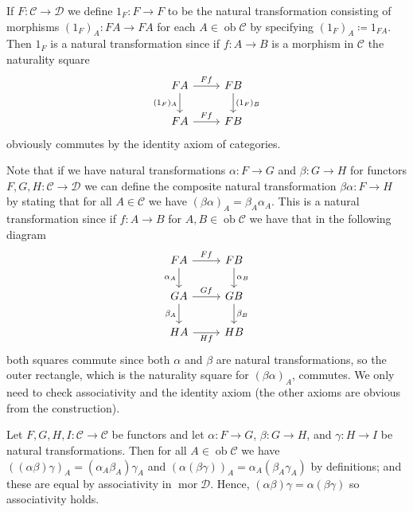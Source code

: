 \documentclass{report}
\DeclareMathOperator{\ob}{ob}
\DeclareMathOperator{\mor}{mor}
\theoremstyle{definition}
\theoremstyle{plain}
\theoremstyle{definition}
\begin{document}
	If $F\colon \mathcal{C} \to \mathcal{D}$ we define $1_F \colon F \to F$ to be the natural transformation consisting of morphisms $(1_F)_A \colon FA \to FA$ for each $A\in \ob \mathcal{C}$ by specifying $(1_F)_A \coloneqq 1_{FA}$. Then $1_F$ is a natural transformation since if $f\colon A \to B$ is a morphism in $\mathcal{C}$ the naturality square
	\[\begin{tikzcd}
		FA & FB \\
		FA & FB
		\arrow["Ff", from=1-1, to=1-2]
		\arrow["Ff", from=2-1, to=2-2]
		\arrow["{(1_F)_A}"', from=1-1, to=2-1]
		\arrow["{(1_F)_B}", from=1-2, to=2-2]
	\end{tikzcd}\]
	obviously commutes by the identity axiom of categories. 
	
	Note that if we have natural transformations $\alpha\colon F \to G$ and $\beta \colon G \to H$ for functors $F,G,H \colon \mathcal{C} \to \mathcal{D}$ we can define the composite natural transformation $\beta\alpha \colon F \to H$ by stating that for all $A \in \mathcal{C}$ we have $(\beta\alpha)_A = \beta_A\alpha_A$. This is a natural transformation since if $f\colon A \to B$ for $A,B\in\ob \mathcal{C}$ we have that in the following diagram
	\[\begin{tikzcd}
		FA & FB \\
		GA & GB \\
		HA & HB
		\arrow["Ff", from=1-1, to=1-2]
		\arrow["Gf", from=2-1, to=2-2]
		\arrow["{\alpha_A}"', from=1-1, to=2-1]
		\arrow["{\alpha_B}", from=1-2, to=2-2]
		\arrow["{\beta_A}"', from=2-1, to=3-1]
		\arrow["{\beta_B}", from=2-2, to=3-2]
		\arrow["Hf"', from=3-1, to=3-2]
	\end{tikzcd}\]
	both squares commute since both $\alpha$ and $\beta$ are natural transformations, so the outer rectangle, which is the naturality square for $(\beta\alpha)_A$, commutes. We only need to check associativity and the identity axiom (the other axioms are obvious from the construction).
	
	Let $F,G,H,I\colon \mathcal{C}\to\mathcal{C}$ be functors and let $\alpha\colon F\to G$, $\beta\colon G\to H$, and $\gamma\colon H \to I$ be natural transformations. Then for all $A\in\ob \mathcal{C}$ we have $((\alpha\beta)\gamma)_A = (\alpha_A\beta_A)\gamma_A$ and $(\alpha(\beta\gamma))_A = \alpha_A(\beta_A\gamma_A)$ by definitions; and these are equal by associativity in $\mor \mathcal{D}$. Hence, $(\alpha\beta)\gamma = \alpha(\beta\gamma)$ so associativity holds.
	
\end{document}
